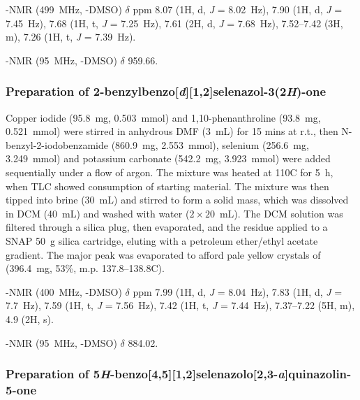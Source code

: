 \begin{refsection}
    -NMR (499~MHz, -DMSO) $ \delta $ ppm 8.07 (1H, d, \textit{J} = 8.02~Hz), 7.90 (1H, d, \textit{J} = 7.45~Hz), 7.68 (1H, t, \textit{J} = 7.25~Hz), 7.61 (2H, d, \textit{J} = 7.68~Hz), 7.52--7.42 (3H, m), 7.26 (1H, t, \textit{J} = 7.39~Hz).
    
    -NMR (95~MHz, -DMSO) $ \delta $ 959.66.
    
    \subsubsection[Preparation of \refcmpd{ebs.bn}]{Preparation of 2-benzylbenzo[\textit{d}][1,2]selenazol-3(2\textit{H})-one }
    
    Copper iodide (95.8~mg, 0.503~mmol) and 1,10-phenanthroline (93.8~mg, 0.521~mmol) were stirred in anhydrous DMF (3~mL) for 15 mins at r.t., then N-benzyl-2-iodobenz\-amide (860.9~mg, 2.553~mmol), selenium (256.6~mg, 3.249~mmol) and potassium carbonate (542.2~mg, 3.923~mmol) were added sequentially under a flow of argon.
    The mixture was heated at 110\degree{}C for 5~h, when TLC showed consumption of starting material.
    The mixture was then tipped into brine (30~mL) and stirred to form a solid mass, which was dissolved in DCM (40~mL) and washed with water ($ 2 \times 20 $~mL).
    The DCM solution was filtered through a silica plug, then evaporated, and the residue applied to a SNAP 50~g silica cartridge, eluting with a petroleum ether/ethyl acetate gradient.
    The major peak was evaporated to afford pale yellow crystals of  (396.4~mg, 53\%, m.p. 137.8--138.8\degree{}C).
    
    -NMR (400~MHz, -DMSO) $\delta$ ppm 7.99 (1H, d, \textit{J} = 8.04~Hz), 7.83 (1H, d, \textit{J} = 7.7~Hz), 7.59 (1H, t, \textit{J} = 7.56~Hz), 7.42 (1H, t, \textit{J} = 7.44~Hz), 7.37--7.22 (5H, m), 4.9 (2H, s).
    
    -NMR (95~MHz, -DMSO) $ \delta $ 884.02.
    
    \subsubsection[Preparation of \refcmpd{tetracycle}]{Preparation of 5\textit{H}-benzo[4,5][1,2]selenazolo[2,3-\textit{a}]quinazolin-5-one }
    

\end{refsection}
